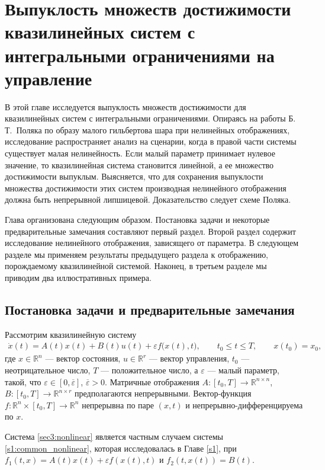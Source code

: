 \documentclass[../main.tex]{subfiles}
\begin{document}
\clearpage
\section{Выпуклость множеств достижимости квазилинейных систем с интегральными ограничениями на управление}
В этой главе исследуется выпуклость множеств достижимости для квазилинейных систем с интегральными ограничениями. 
Опираясь на работы Б.\,Т.~Поляка \cite{Polyak2001,Polyak2004} по образу малого гильбертова шара при нелинейных отображениях, исследование распространяет анализ на сценарии, когда в правой части системы существует малая нелинейность. 
Если малый параметр принимает нулевое значение, то квазилинейная система становится линейной, а ее множество достижимости выпуклым. 
Выясняется, что для сохранения выпуклости множества достижимости этих систем производная нелинейного отображения должна быть непрерывной липшицевой. 
Доказательство следует схеме Поляка. 

Глава организована следующим образом. 
Постановка задачи и некоторые предварительные замечания составляют первый раздел. 
Второй раздел содержит исследование нелинейного отображения, зависящего от параметра. 
В следующем разделе мы применяем результаты предыдущего раздела к отображению, порождаемому квазилинейной системой. 
Наконец, в третьем разделе мы приводим два иллюстративных примера.

\subsection{Постановка задачи и предварительные замечания}

Рассмотрим квазилинейную систему
\begin{gather}\label{sec3:nonlinear}
 \dot{x}(t) = A(t)x(t)+B(t)u(t)+\varepsilon f\big(x(t),t\big), \qquad t_0 \leqslant t \leqslant T, \qquad x(t_0) = x_0,
\end{gather}
где $ x \in \mathbb{R}^n $ --- вектор состояния, $ u \in \mathbb{R}^r $ --- вектор управления, $t_0$ --- неотрицательное число, $T$ --- положительное число, а $\varepsilon$ --- малый параметр, такой, что $\varepsilon \in [0,\overline{\varepsilon}]$, $ \overline{\varepsilon} > 0$. 
Матричные отображения $A:[t_0,T] \to \mathbb{R}^{n\times n} $, $B: [t_0,T] \to \mathbb{R}^{n\times r} $ предполагаются непрерывными. 
Вектор-функция $f: \mathbb{R}^n \times [t_0,T] \to \mathbb{R}^n$ непрерывна по паре $(x,t)$ и непрерывно-дифференцируема по $x$.

Система \eqref{sec3:nonlinear} является частным случаем системы \eqref{s1:common_nonlinear}, которая исследовалась в Главе \ref{s1}, при $f_1(t,x) = A(t) x(t) + \varepsilon f(x(t),t)$ и $f_2(t, x(t)) = B(t)$.
\end{document}
